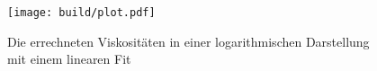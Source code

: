 \begin{figure}
    \centering
    \texttt{[image: build/plot.pdf]}
    \caption{Die errechneten Viskositäten in einer logarithmischen Darstellung mit einem linearen Fit}
    \label{fig:groKu_steigendeTemp_eta_fit}
\end{figure}
%


